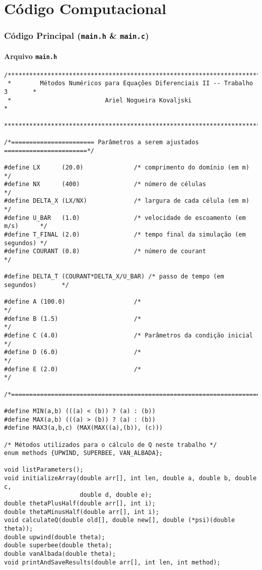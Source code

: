 \chapter{Código Computacional}

\subsection{Código Principal (\texttt{main.h} \& \texttt{main.c})}

\subsubsection{Arquivo \texttt{main.h}}

\begin{Verbatim}[fontsize=\footnotesize]
/******************************************************************************
 *        Métodos Numéricos para Equações Diferenciais II -- Trabalho 3       *
 *                          Ariel Nogueira Kovaljski                          *
 ******************************************************************************/

/*======================= Parâmetros a serem ajustados =======================*/

#define LX      (20.0)              /* comprimento do domínio (em m)          */
#define NX      (400)               /* número de células                      */
#define DELTA_X (LX/NX)             /* largura de cada célula (em m)          */
#define U_BAR   (1.0)               /* velocidade de escoamento (em m/s)      */
#define T_FINAL (2.0)               /* tempo final da simulação (em segundos) */
#define COURANT (0.8)               /* número de courant                      */

#define DELTA_T (COURANT*DELTA_X/U_BAR) /* passo de tempo (em segundos)       */

#define A (100.0)                   /*                                */
#define B (1.5)                     /*                                */
#define C (4.0)                     /* Parâmetros da condição inicial */
#define D (6.0)                     /*                                */
#define E (2.0)                     /*                                */

/*============================================================================*/

#define MIN(a,b) (((a) < (b)) ? (a) : (b))
#define MAX(a,b) (((a) > (b)) ? (a) : (b))
#define MAX3(a,b,c) (MAX(MAX((a),(b)), (c)))

/* Métodos utilizados para o cálculo de Q neste trabalho */
enum methods {UPWIND, SUPERBEE, VAN_ALBADA};

void listParameters();
void initializeArray(double arr[], int len, double a, double b, double c,
                     double d, double e);
double thetaPlusHalf(double arr[], int i);
double thetaMinusHalf(double arr[], int i);
void calculateQ(double old[], double new[], double (*psi)(double theta));
double upwind(double theta);
double superbee(double theta);
double vanAlbada(double theta);
void printAndSaveResults(double arr[], int len, int method);
\end{Verbatim}

